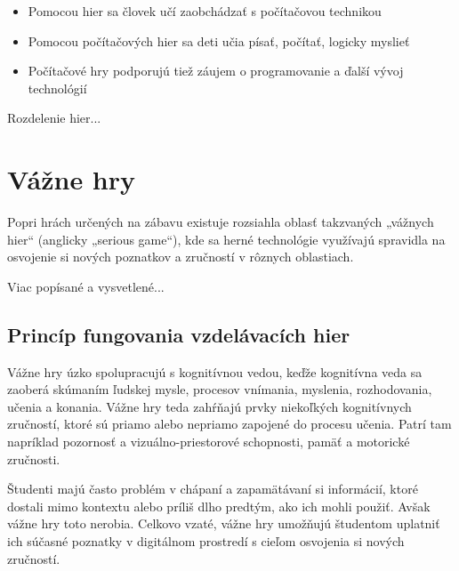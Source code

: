 \documentclass[10pt,twoside,slovak,a4paper]{article}
\begin{document}
\begin{itemize}
\item Pomocou hier sa človek učí zaobchádzať s počítačovou technikou
\item Pomocou počítačových hier sa deti učia písať, počítať, logicky myslieť
\item Počítačové hry podporujú tiež záujem o programovanie a ďalší vývoj technológií
\end{itemize}


\vspace{5mm}

Rozdelenie hier...


\vspace{5mm}


\section{Vážne hry} \label{Vazne hry}


Popri hrách určených na zábavu existuje rozsiahla oblasť takzvaných „vážnych hier“ (anglicky „serious game“), kde sa herné technológie využívajú spravidla na osvojenie si nových poznatkov a zručností v rôznych oblastiach.

\vspace{5mm}

Viac popísané a vysvetlené...


\subsection{Princíp fungovania vzdelávacích hier} \label{Fungovanie}



Vážne hry úzko spolupracujú s kognitívnou vedou, keďže kognitívna veda sa zaoberá skúmaním ľudskej mysle, procesov vnímania, myslenia, rozhodovania, učenia a konania. Vážne hry teda zahŕňajú prvky niekoľkých kognitívnych zručností, ktoré sú priamo alebo nepriamo zapojené do procesu učenia. Patrí tam napríklad pozornosť a vizuálno-priestorové schopnosti, pamäť a motorické zručnosti. \cite{Ypsilanti}

\vspace{5mm} %

Študenti majú často problém v chápaní a zapamätávaní si informácií, ktoré dostali mimo kontextu alebo príliš dlho predtým, ako ich mohli použiť. Avšak vážne hry toto nerobia. Celkovo vzaté, vážne hry umožňujú študentom uplatniť ich súčasné poznatky v digitálnom prostredí s cieľom osvojenia si nových zručností. \cite{Gee}
\end{document}
